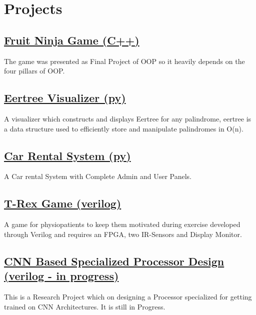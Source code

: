\documentclass[]{plushcv}
\begin{document}
\begin{minipage}[t]{0.25\textwidth} 
    

\section{Projects}

    \subsection{\href{https://github.com/smabbasht/CS224-OOP-FruitNinjaGame-cpp}{\textbf{Fruit Ninja Game (C++)}}}
    The game was presented as Final Project of OOP so it heavily depends on the four pillars of OOP.

    \subsection{\href{https://github.com/smabbasht/CS201-DataSructures-II-Project-eertree}{\textbf{Eertree Visualizer (py)}}}
    A visualizer which constructs and displays Eertree for any palindrome, eertree is a data structure used to efficiently store and manipulate palindromes in O(n). 

    \subsection{\href{https://github.com/smabbasht/HU-DSA-Project}{\textbf{Car Rental System (py)}}}
    A Car rental System with Complete Admin and User Panels.

    \subsection{\href{https://github.com/smabbasht/CS370-DIgital-Logic-Design-Project}{\textbf{T-Rex Game (verilog)}}}
    A game for physiopatients to keep them motivated during exercise developed through Verilog and requires an FPGA, two IR-Sensors and Display Monitor.
    
    \subsection{\href{https://github.com/smabbasht/CS330-ResearchProject-ComputerArchitecture}{CNN Based Specialized Processor Design (verilog - in progress)}}
    This is a Research Project which on designing a Processor specialized for getting trained on CNN Architectures. It is still in Progress.


\end{minipage}
\end{document}
